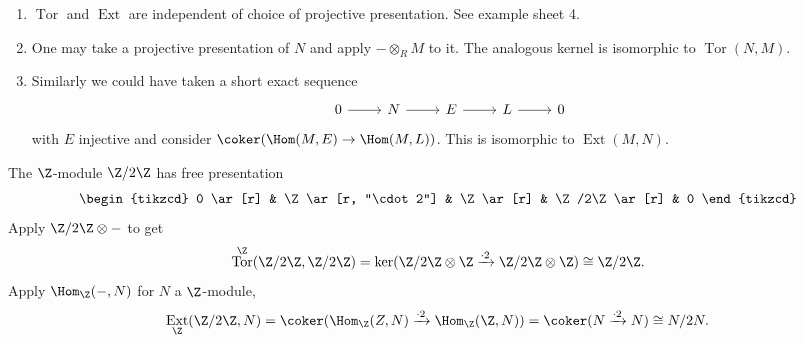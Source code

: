 \documentclass[a4paper]{article}
\DeclareMathOperator{\Tor}{Tor}
\DeclareMathOperator{\Ext}{Ext}
\begin{document}
\begin{remark}\leavevmode
  \begin{enumerate}
  \item \(\Tor\) and \(\Ext\) are independent of choice of projective presentation. See example sheet 4.
  \item One may take a projective presentation of \(N\) and apply \(- \otimes_R M\) to it. The analogous kernel is isomorphic to \(\Tor(N, M)\).
  \item Similarly we could have taken a short exact sequence
    \[
      \begin{tikzcd}
        0 \ar[r] & N \ar[r] & E \ar[r] & L \ar[r] & 0
      \end{tikzcd}
    \]
    with \(E\) injective and consider \(\coker(\Hom(M, E) \to \Hom(M, L))\). This is isomorphic to \(\Ext(M, N)\).
  \end{enumerate}
\end{remark}

\begin{eg}
  The \(\Z\)-module \(\Z/2\Z\) has free presentation
  \[
    \begin{tikzcd}
      0 \ar[r] & \Z \ar[r, "\cdot 2"] & \Z \ar[r] & \Z/2\Z \ar[r] & 0
    \end{tikzcd}
  \]
  Apply \(\Z/2\Z \otimes -\) to get
  \[
    \Tor^\Z(\Z/2\Z, \Z/2\Z) = \ker(\Z/2\Z \otimes \Z \xrightarrow{\cdot 2} \Z/2\Z \otimes \Z) \cong \Z/2\Z.
  \]
  Apply \(\Hom_\Z(-, N)\) for \(N\) a \(\Z\)-module,
  \[
    \Ext_\Z(\Z/2\Z, N) = \coker(\Hom_\Z(Z, N) \xrightarrow{\cdot 2} \Hom_\Z(\Z, N)) = \coker(N \xrightarrow{\cdot 2} N) \cong N/2N.
  \]
\end{eg}
\end{document}
